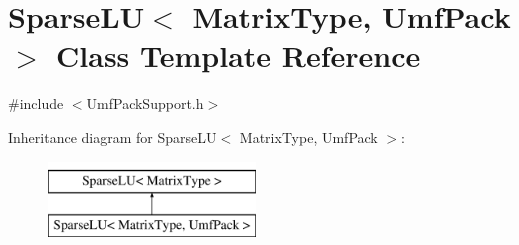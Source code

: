 \hypertarget{class_sparse_l_u_3_01_matrix_type_00_01_umf_pack_01_4}{\section{Sparse\-L\-U$<$ Matrix\-Type, Umf\-Pack $>$ Class Template Reference}
\label{class_sparse_l_u_3_01_matrix_type_00_01_umf_pack_01_4}
}


{\ttfamily \#include $<$Umf\-Pack\-Support.\-h$>$}

Inheritance diagram for Sparse\-L\-U$<$ Matrix\-Type, Umf\-Pack $>$\-:\begin{figure}[H]
\begin{center}
\leavevmode
\includegraphics[height=2.000000cm]{class_sparse_l_u_3_01_matrix_type_00_01_umf_pack_01_4}
\end{center}
\end{figure}
